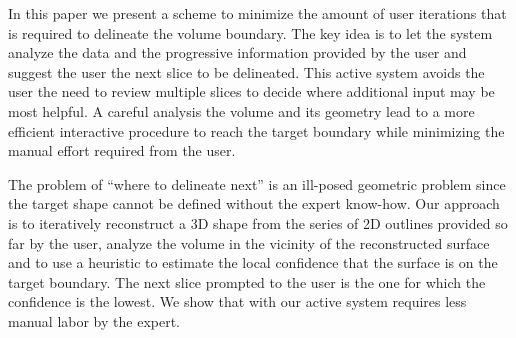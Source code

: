 In this paper we present a scheme to minimize the amount of user iterations that is required to delineate the volume boundary. The key idea is to let the system analyze the data and the progressive information provided by the user and suggest the user the next slice to be delineated. This active system avoids the user the need to review multiple slices to decide where additional input may be most helpful. A careful analysis the volume and its geometry lead to a more efficient interactive procedure to reach the target boundary while minimizing the manual effort required from the user.

The problem of ``where to delineate next'' is an ill-posed geometric problem since the target shape cannot be defined without the expert know-how. Our approach is to iteratively reconstruct a 3D shape from the series of 2D outlines provided so far by the user, analyze the volume in the vicinity of the reconstructed surface and to use a heuristic to estimate the local confidence that the surface is on the target boundary. The next slice prompted to the user is the one for which the confidence is the lowest. 
We show that with our active system requires less manual labor by the expert.

